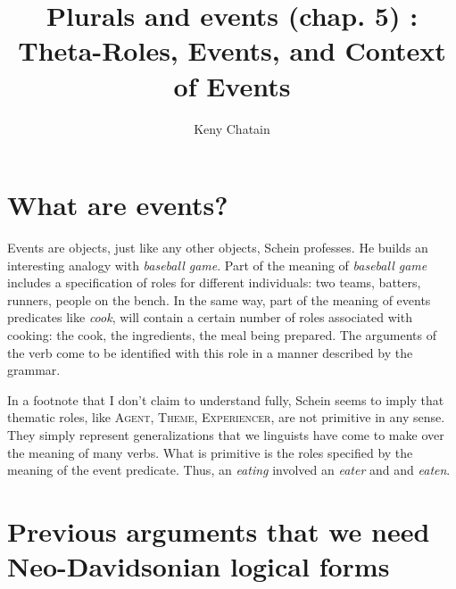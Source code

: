 




\newcommand{\scale}1

\title{Plurals and events (chap. 5) : Theta-Roles, Events, and Context of Events}
\author{Keny Chatain}


\maketitle

\section{What are events?}

Events are objects, just like any other objects, Schein professes. He builds an interesting analogy with \emph{baseball game}. Part of the meaning of \emph{baseball game} includes a specification of roles for different individuals: two teams, batters, runners, people on the bench. In the same way, part of the meaning of events predicates like \emph{cook}, will contain a certain number of roles associated with cooking: the cook, the ingredients, the meal being prepared. The arguments of the verb come to be identified with this role in a manner described by the grammar.

In a footnote that I don't claim to understand fully, Schein seems to imply that  thematic roles, like \textsc{Agent}, \textsc{Theme}, \textsc{Experiencer}, are not primitive in any sense. They simply represent generalizations that we linguists have come to make over the meaning of many verbs.  What is primitive is the roles specified by the meaning of the event predicate. Thus, an \emph{eating} involved an \emph{eater} and and \emph{eaten}.

\section{Previous arguments that we need Neo-Davidsonian logical forms}

